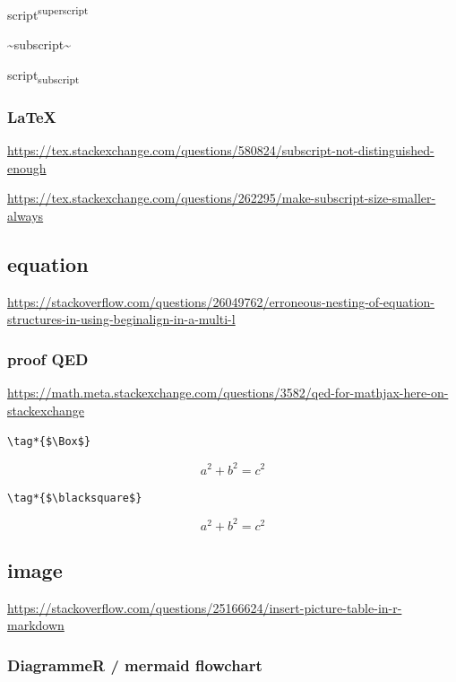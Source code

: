 \documentclass[
]{book}
\newenvironment{Shaded}{\begin{snugshade}}{\end{snugshade}}
\newcommand{\NormalTok}[1]{#1}
\theoremstyle{definition}
\theoremstyle{definition}
\theoremstyle{definition}
\theoremstyle{definition}
\theoremstyle{remark}
\begin{document}
script\textsuperscript{superscript}

\begin{Shaded}
\begin{Highlighting}[]
\NormalTok{\textasciitilde{}subscript\textasciitilde{}}
\end{Highlighting}
\end{Shaded}

script\textsubscript{subscript}

\subsubsection{LaTeX}\label{latex}

\url{https://tex.stackexchange.com/questions/580824/subscript-not-distinguished-enough}

\url{https://tex.stackexchange.com/questions/262295/make-subscript-size-smaller-always}

\subsection{equation}\label{equation}

\url{https://stackoverflow.com/questions/26049762/erroneous-nesting-of-equation-structures-in-using-beginalign-in-a-multi-l}

\subsubsection{proof QED}\label{proof-qed}

\url{https://math.meta.stackexchange.com/questions/3582/qed-for-mathjax-here-on-stackexchange}

\texttt{\textbackslash{}tag*\{\$\textbackslash{}Box\$\}}

\[
a^2+b^2=c^2 \tag*{$\Box$}
\]

\texttt{\textbackslash{}tag*\{\$\textbackslash{}blacksquare\$\}}

\[
a^2+b^2=c^2 \tag*{$\blacksquare$}
\]

\subsection{image}\label{image}

\url{https://stackoverflow.com/questions/25166624/insert-picture-table-in-r-markdown}

\subsubsection{DiagrammeR / mermaid flowchart}\label{diagrammer-mermaid-flowchart}
\end{document}
